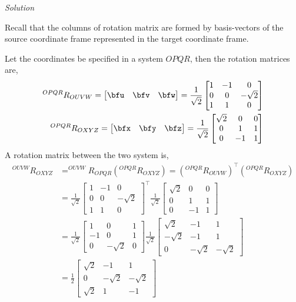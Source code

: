 \documentclass{article}
\numberwithin{prob}{section}
\newenvironment{solution}{\emph{Solution}}{}
\begin{document}
\begin{solution}

Recall that the columns of rotation matrix are formed by basis-vectors of the source coordinate frame represented in the target coordinate frame.

Let the coordinates be specified in a system $OPQR$, then the rotation matrices are, 
\begin{align}
  ^{OPQR}R_{OUVW} = \begin{bmatrix}
    \bfu & \bfv & \bfw 
  \end{bmatrix} 
  = \frac{1}{\sqrt2}\begin{bmatrix} 
    1 & -1 & 0 \\
    0 & 0 & -\sqrt{2} \\
    1 & 1 & 0
  \end{bmatrix}\\
  ^{OPQR}R_{OXYZ} = \begin{bmatrix}
    \bfx & \bfy & \bfz 
  \end{bmatrix} 
  = \frac{1}{\sqrt2}\begin{bmatrix} 
    \sqrt2 & 0 & 0 \\
    0 & 1 & 1\\
    0 & -1 & 1
  \end{bmatrix}
\end{align}
A rotation matrix between the two system is,
\begin{align}
  ^{OUVW}R_{OXYZ} &= ^{OUVW}R_{OPQR} (^{OPQR}R_{OXYZ}) = (^{OPQR}R_{OUVW})^\top (^{OPQR}R_{OXYZ})\\
                  &= \frac{1}{\sqrt2}\begin{bmatrix} 
    1 & -1 & 0 \\
    0 & 0 & -\sqrt{2} \\
    1 & 1 & 0
  \end{bmatrix}^\top
  \frac{1}{\sqrt2}\begin{bmatrix} 
    \sqrt2 & 0 & 0 \\
    0 & 1 & 1\\
    0 & -1 & 1
  \end{bmatrix}\\
                  &= \frac{1}{\sqrt2}\begin{bmatrix} 
    1 & 0 & 1 \\
    -1 & 0 & 1 \\
    0 & -\sqrt2  & 0
  \end{bmatrix}
  \frac{1}{\sqrt2}\begin{bmatrix} 
    \sqrt2 & -1 & 1\\
    -\sqrt2 & -1 & 1\\
    0 & -\sqrt2 & -\sqrt2
  \end{bmatrix}\\
                  &= \frac{1}{2}\begin{bmatrix}
                    \sqrt{2} & -1 & 1 \\
                    0 & -\sqrt2 & -\sqrt2\\
                    \sqrt2 & 1 & -1
                  \end{bmatrix}
\end{align}
\end{solution}
\end{document}
